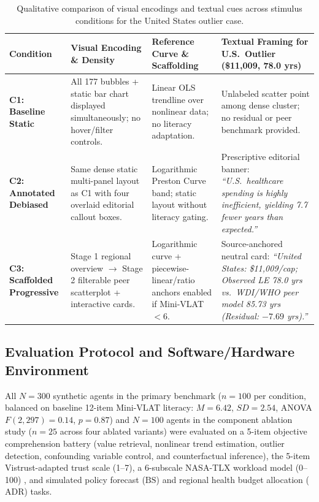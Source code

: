 \documentclass[conference]{IEEEtran}
\newcommand{\ADR}{\mathrm{ADR}}
\newcommand{\BS}{\mathrm{BS}}
\newcommand{\WdiEvalM}{177}
\newcommand{\UsaChexPc}{\$11,009}
\newcommand{\UsaLeObs}{78.0}
\begin{document}
\begin{table}[!t]
\caption{Qualitative comparison of visual encodings and textual cues across stimulus conditions for the United States outlier case.}
\label{tab:qualitative}
\centering
\footnotesize
\renewcommand{\arraystretch}{1.15}
\begin{tabularx}{\textwidth}{@{}>{\raggedright\arraybackslash}p{2.3cm}>{\raggedright\arraybackslash}p{3.8cm}>{\raggedright\arraybackslash}p{4.6cm}Y@{}}
\toprule
\textbf{Condition} & \textbf{Visual Encoding \& Density} & \textbf{Reference Curve \& Scaffolding} & \textbf{Textual Framing for U.S.\ Outlier (\UsaChexPc{}, \UsaLeObs{} yrs)} \\
\midrule
\textbf{C1: Baseline Static} & All \WdiEvalM{} bubbles + static bar chart displayed simultaneously; no hover/filter controls. & Linear OLS trendline over nonlinear data; no literacy adaptation. & Unlabeled scatter point among dense cluster; no residual or peer benchmark provided. \\
\textbf{C2: Annotated Debiased} & Same dense static multi-panel layout as C1 with four overlaid editorial callout boxes. & Logarithmic Preston Curve band; static layout without literacy gating. & Prescriptive editorial banner: \textit{``U.S.\ healthcare spending is highly inefficient, yielding 7.7 fewer years than expected.''} \\
\textbf{C3: Scaffolded Progressive} & Stage 1 regional overview $\rightarrow$ Stage 2 filterable peer scatterplot + interactive cards. & Logarithmic curve + piecewise-linear/ratio anchors enabled if Mini-VLAT $< 6$. & Source-anchored neutral card: \textit{``United States: \$11,009/cap; Observed LE 78.0 yrs vs.\ WDI/WHO peer model 85.73 yrs (Residual: $-7.69$ yrs).''} \\
\bottomrule
\end{tabularx}
\end{table}

\subsection{Evaluation Protocol and Software/Hardware Environment}
All $N = 300$ synthetic agents in the primary benchmark ($n = 100$ per condition, balanced on baseline 12-item Mini-VLAT literacy: $M = 6.42$, $SD = 2.54$, ANOVA $F(2,297) = 0.14$, $p = 0.87$) and $N = 100$ agents in the component ablation study ($n = 25$ across four ablated variants) were evaluated on a 5-item objective comprehension battery (value retrieval, nonlinear trend estimation, outlier detection, confounding variable control, and counterfactual inference), the 5-item Vistrust-adapted trust scale (1--7), a 6-subscale NASA-TLX workload model (0--100) \cite{hart1988}, and simulated policy forecast ($\BS$) and regional health budget allocation ($\ADR$) tasks.
\end{document}
